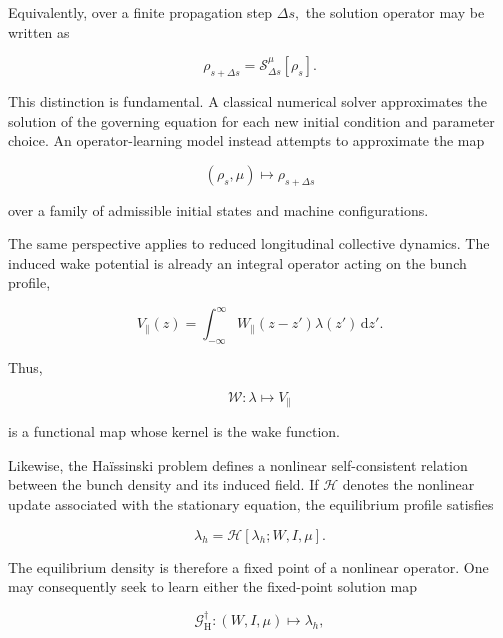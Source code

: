 Equivalently, over a finite propagation step \(\Delta s ,\) the solution operator may be written as

\begin{equation}
\label{eq:71}
\rho_{s+\Delta s}=\mathcal S_{\Delta s}^{\mu}[\rho_s].
\end{equation}

This distinction is fundamental. A classical numerical solver approximates the solution of the governing equation for each new initial condition and parameter choice. An operator-learning model instead attempts to approximate the map

\begin{equation}
\label{eq:72}
(\rho_s,\mu)\longmapsto\rho_{s+\Delta s}
\end{equation}

over a family of admissible initial states and machine configurations.

The same perspective applies to reduced longitudinal collective dynamics. The induced wake potential is already an integral operator acting on the bunch profile,

\begin{equation}
\label{eq:73}
V_{\parallel}(z)=\int_{-\infty}^{\infty}W_{\parallel}(z-z')\lambda(z')\,\mathrm dz'.
\end{equation}

Thus,

\begin{equation}
\label{eq:74}
\mathcal W:\lambda\longmapsto V_{\parallel}
\end{equation}

is a functional map whose kernel is the wake function.

Likewise, the Haïssinski problem defines a nonlinear self-consistent relation between the bunch density and its induced field. If \(\mathcal{H}\) denotes the nonlinear update associated with the stationary equation, the equilibrium profile satisfies \cite{funkner2025wake}

\begin{equation}
\label{eq:75}
\lambda_h=\mathcal H[\lambda_h;W,I,\mu].
\end{equation}

The equilibrium density is therefore a fixed point of a nonlinear operator. One may consequently seek to learn either the fixed-point solution map

\begin{equation}
\label{eq:76}
\mathcal G_{\mathrm H}^{\dagger}:(W,I,\mu)\longmapsto\lambda_h,
\end{equation}

